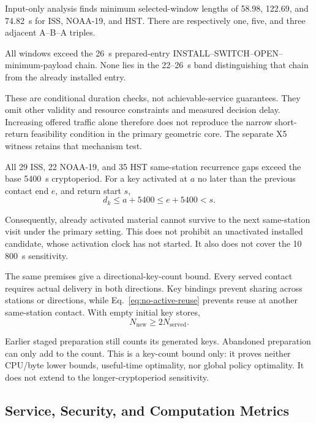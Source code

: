 \documentclass[conference]{IEEEtran}
\begin{document}
Input-only analysis finds minimum selected-window lengths
of 58.98, 122.69, and 74.82~s for ISS, NOAA-19, and HST.
There are respectively one, five, and three adjacent
A--B--A triples.

All windows exceed the 26~s prepared-entry
INSTALL--SWITCH--OPEN--minimum-payload chain.
None lies in the 22--26~s band distinguishing that chain
from the already installed entry.

These are conditional duration checks, not achievable-service
guarantees.
They omit other validity and resource constraints and measured
decision delay.
Increasing offered traffic alone therefore does not reproduce
the narrow short-return feasibility condition in the primary
geometric core.
The separate X5 witness retains that mechanism test.

All 29 ISS, 22 NOAA-19, and 35 HST same-station recurrence
gaps exceed the base 5400~s cryptoperiod.
For a key activated at $a$ no later than the previous contact
end $e$, and return start $s$,
\begin{equation}
    d_k
    \leq a+5400
    \leq e+5400
    <s.
    \label{eq:no-active-reuse}
\end{equation}

Consequently, already activated material cannot survive to
the next same-station visit under the primary setting.
This does not prohibit an unactivated installed candidate,
whose activation clock has not started.
It also does not cover the 10\,800~s sensitivity.

The same premises give a directional-key-count bound.
Every served contact requires actual delivery in both
directions.
Key bindings prevent sharing across stations or directions,
while Eq.~\eqref{eq:no-active-reuse} prevents reuse at another
same-station contact.
With empty initial key stores,
\begin{equation}
    N_{\mathrm{new}}
    \geq
    2N_{\mathrm{served}}.
    \label{eq:key-bound}
\end{equation}

Earlier staged preparation still counts its generated keys.
Abandoned preparation can only add to the count.
This is a key-count bound only:
it proves neither CPU/byte lower bounds, useful-time optimality,
nor global policy optimality.
It does not extend to the longer-cryptoperiod sensitivity.

\subsection{Service, Security, and Computation Metrics}
\end{document}
